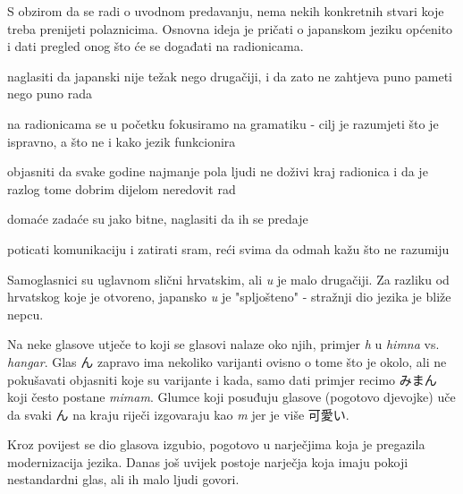 
\author{autor}

	
	S obzirom da se radi o uvodnom predavanju, nema nekih konkretnih stvari koje treba prenijeti polaznicima. Osnovna ideja je pričati o japanskom jeziku općenito i dati pregled onog što će se događati na radionicama.
	
	\begin{hyou}
		\item naglasiti da japanski nije težak nego drugačiji, i da zato ne zahtjeva puno pameti nego puno rada
		\item na radionicama se u početku fokusiramo na gramatiku - cilj je razumjeti što je ispravno, a što ne i kako jezik funkcionira
		\item objasniti da svake godine najmanje pola ljudi ne doživi kraj radionica i da je razlog tome dobrim dijelom neredovit rad
		\item domaće zadaće su jako bitne, naglasiti da ih se predaje
		\item poticati komunikaciju i zatirati sram, reći svima da odmah kažu što ne razumiju
	\end{hyou}

	
	Samoglasnici su uglavnom slični hrvatskim, ali \textit{u} je malo drugačiji. Za razliku od hrvatskog koje je otvoreno, japansko \textit{u} je "spljošteno" - stražnji dio jezika je bliže nepcu.
	
	\vspace{10pt}
	Na neke glasove utječe to koji se glasovi nalaze oko njih, primjer \textit{h} u \textit{himna} vs. \textit{hangar}. Glas ん zapravo ima nekoliko varijanti ovisno o tome što je okolo, ali ne pokušavati objasniti koje su varijante i kada, samo dati primjer recimo みまん koji često postane \textit{mimam}. Glumce koji posuđuju glasove (pogotovo djevojke) uče da svaki ん na kraju riječi izgovaraju kao \textit{m} jer je više 可愛い.
	
	\vspace{10pt}
	Kroz povijest se dio glasova izgubio, pogotovo u narječjima koja je pregazila modernizacija jezika. Danas još uvijek postoje narječja koja imaju pokoji nestandardni glas, ali ih malo ljudi govori.
	

